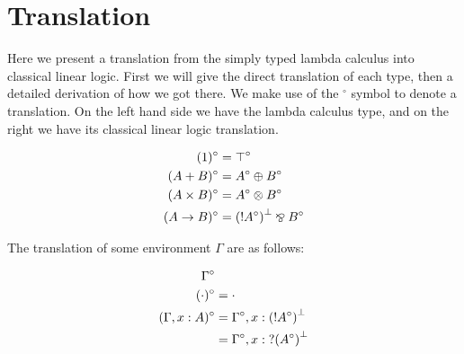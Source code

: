 \chapter{Translation}

Here we present a translation from the simply typed lambda calculus into classical linear logic. First 
we will give the direct translation of each type, then a detailed derivation of how we got there. We 
make use of the $^{\circ}$ symbol to denote a translation. On the left hand side we have the lambda 
calculus type, and on the right we have its classical linear logic translation.

\begin{align*}
    (1)^\circ &= \top^\circ \\
    (A + B)^\circ &= A^\circ \oplus B^\circ \\
    (A \times B)^\circ &= A^\circ \otimes B^\circ \\
    (A \rightarrow B)^\circ &= \negg{(\ofc A^\circ)} \parr B^\circ
\end{align*}

The translation of some environment $\Gamma$ are as follows:

\begin{align*}
  \Gamma^\circ & \\
  (\cdot)^\circ &= \cdot \\
  (\Gamma, x:A)^\circ &= \Gamma^\circ, x: \negg{(\ofc A^\circ)} \\
   &= \Gamma^\circ, x: \whynot \negg{(A^\circ)}
\end{align*}

